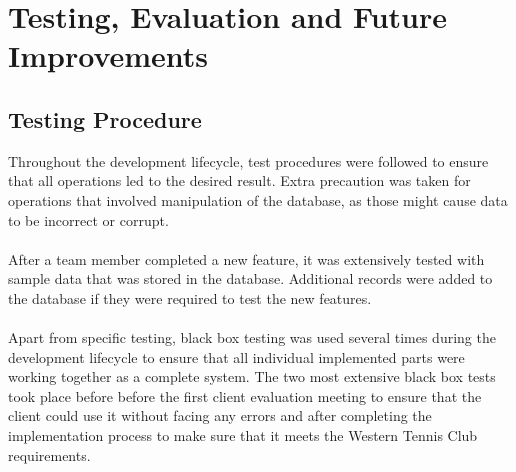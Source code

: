 \documentclass{l3proj}
\begin{document}
\chapter{Testing, Evaluation and Future Improvements}
\label{testevfutimprv}

\section{Testing Procedure}
Throughout the development lifecycle, test procedures were followed to ensure that all operations led to the desired result. Extra precaution was taken for operations that involved manipulation of the database, as those might cause data to be incorrect or corrupt.\\
\\After a team member completed a new feature, it was extensively tested with sample data that was stored in the database. Additional records were added to the database if they were required to test the new features.\\
\\ Apart from specific testing, black box testing was used several times during the development lifecycle to ensure that all individual implemented parts were working together as a complete system. The two most extensive black box tests took place before before the first client evaluation meeting to ensure that the client could use it without facing any errors and after completing the implementation process to make sure that it meets the Western Tennis Club requirements.

\end{document}
